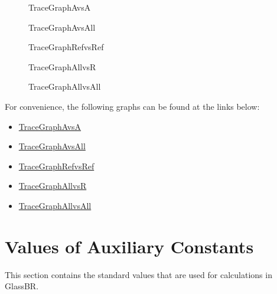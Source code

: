 \documentclass[12pt]{article}
\begin{document}
\begin{figure}[H]
\begin{center}

\caption{TraceGraphAvsA}
\label{Figure:TraceGraphAvsA}
\end{center}
\end{figure}
\begin{figure}[H]
\begin{center}

\caption{TraceGraphAvsAll}
\label{Figure:TraceGraphAvsAll}
\end{center}
\end{figure}
\begin{figure}[H]
\begin{center}

\caption{TraceGraphRefvsRef}
\label{Figure:TraceGraphRefvsRef}
\end{center}
\end{figure}
\begin{figure}[H]
\begin{center}

\caption{TraceGraphAllvsR}
\label{Figure:TraceGraphAllvsR}
\end{center}
\end{figure}
\begin{figure}[H]
\begin{center}

\caption{TraceGraphAllvsAll}
\label{Figure:TraceGraphAllvsAll}
\end{center}
\end{figure}
For convenience, the following graphs can be found at the links below:

\begin{itemize}
\item{\hyperref{../../TraceyGraph/avsa.svg}{}{}{TraceGraphAvsA}}
\item{\hyperref{../../TraceyGraph/avsall.svg}{}{}{TraceGraphAvsAll}}
\item{\hyperref{../../TraceyGraph/refvsref.svg}{}{}{TraceGraphRefvsRef}}
\item{\hyperref{../../TraceyGraph/allvsr.svg}{}{}{TraceGraphAllvsR}}
\item{\hyperref{../../TraceyGraph/allvsall.svg}{}{}{TraceGraphAllvsAll}}
\end{itemize}
\section{Values of Auxiliary Constants}
\label{Sec:AuxConstants}
This section contains the standard values that are used for calculations in GlassBR.
\end{document}

